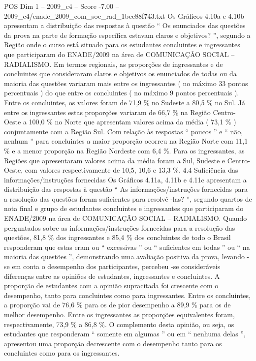 \begin{textsample}{POS Dim 1 – 2009\_c4 – Score -7.00 – 2009\_c4/enade\_2009\_com\_soc\_rad\_1bee88f743.txt}
Os Gráficos 4.10a e 4.10b apresentam a distribuição das respostas à questão “ Os enunciados das questões da prova na parte de formação específica estavam claros e objetivos? ”, segundo a Região onde o curso está situado para os estudantes concluintes e ingressantes que participaram do ENADE/2009 na área de COMUNICAÇÃO SOCIAL – RADIALISMO.
Em termos regionais, as proporções de ingressantes e de concluintes que consideraram claros e objetivos os enunciados de todas ou da maioria das questões variaram mais entre os ingressantes ( no máximo 33 pontos percentuais ) do que entre os concluintes ( no máximo 9 pontos percentuais ).
Entre os concluintes, os valores foram de 71,9 \% no Sudeste a 80,5 \% no Sul.
Já entre os ingressantes estas proporções variaram de 66,7 \% na Região Centro-Oeste a 100,0 \% no Norte que apresentam valores acima da média ( 73,1 \% ) conjuntamente com a Região Sul.
Com relação às respostas “ poucos ” e “ não, nenhum ” para concluintes a maior proporção ocorreu na Região Norte com 11,1 \% e a menor proporção na Região Nordeste com 6,4 \%.
Para os ingressantes, as Regiões que apresentaram valores acima da média foram a Sul, Sudeste e Centro-Oeste, com valores respectivamente de 10,5, 10,6 e 13,3 \%. 4.4 Suficiência das informações/instruções fornecidas Os Gráficos 4.11a, 4.11b e 4.11c apresentam a distribuição das respostas à questão “ As informações/instruções fornecidas para a resolução das questões foram suficientes para resolvê -las? ”, segundo quartos de nota final e grupo de estudantes concluintes e ingressantes que participaram do ENADE/2009 na área de COMUNICAÇÃO SOCIAL – RADIALISMO.
Quando perguntados sobre as informações/instruções fornecidas para a resolução das questões, 81,8 \% dos ingressantes e 85,4 \% dos concluintes de todo o Brasil responderam que estas eram ou “ excessivas ” ou “ suficientes em todas ” ou “ na maioria das questões ”, demonstrando uma avaliação positiva da prova, levando -se em conta o desempenho dos participantes, percebeu -se consideráveis diferenças entre as opiniões de estudantes, ingressantes e concluintes.
A proporção de estudantes com a opinião supracitada foi crescente com o desempenho, tanto para concluintes como para ingressantes.
Entre os concluintes, a proporção vai de 76,6 \% para os de pior desempenho a 89,9 \% para os de melhor desempenho.
Entre os ingressantes as proporções equivalentes foram, respectivamente, 73,9 \% a 86,8 \%.
O complemento desta opinião, ou seja, os estudantes que responderam “ somente em algumas ” ou em “ nenhuma delas ”, apresentou uma proporção decrescente com o desempenho tanto para os concluintes como para os ingressantes.

\end{textsample}
